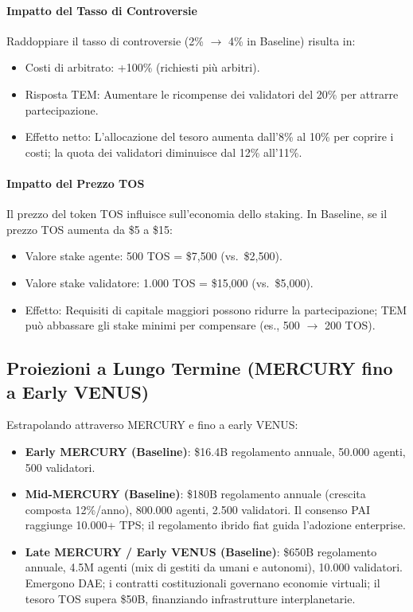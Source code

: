 \documentclass[11pt]{article}
\begin{document}
\begin{itemize}[noitemsep]
\paragraph{Impatto del Tasso di Controversie}
Raddoppiare il tasso di controversie (2\% $\to$ 4\% in Baseline) risulta in:
\begin{itemize}[noitemsep]
  \item Costi di arbitrato: +100\% (richiesti più arbitri).
  \item Risposta TEM: Aumentare le ricompense dei validatori del 20\% per attrarre partecipazione.
  \item Effetto netto: L'allocazione del tesoro aumenta dall'8\% al 10\% per coprire i costi; la quota dei validatori diminuisce dal 12\% all'11\%.
\end{itemize}

\paragraph{Impatto del Prezzo TOS}
Il prezzo del token TOS influisce sull'economia dello staking. In Baseline, se il prezzo TOS aumenta da \$5 a \$15:
\begin{itemize}[noitemsep]
  \item Valore stake agente: 500 TOS = \$7{,}500 (vs.\ \$2{,}500).
  \item Valore stake validatore: 1.000 TOS = \$15{,}000 (vs.\ \$5{,}000).
  \item Effetto: Requisiti di capitale maggiori possono ridurre la partecipazione; TEM può abbassare gli stake minimi per compensare (es., 500 $\to$ 200 TOS).
\end{itemize}

\subsection{Proiezioni a Lungo Termine (MERCURY fino a Early VENUS)}
Estrapolando attraverso MERCURY e fino a early VENUS:
\begin{itemize}[noitemsep]
  \item \textbf{Early MERCURY (Baseline)}: \$16.4B regolamento annuale, 50.000 agenti, 500 validatori.
  \item \textbf{Mid-MERCURY (Baseline)}: \$180B regolamento annuale (crescita composta 12\%/anno), 800.000 agenti, 2.500 validatori. Il consenso PAI raggiunge 10.000+ TPS; il regolamento ibrido fiat guida l'adozione enterprise.
  \item \textbf{Late MERCURY / Early VENUS (Baseline)}: \$650B regolamento annuale, 4.5M agenti (mix di gestiti da umani e autonomi), 10.000 validatori. Emergono DAE; i contratti costituzionali governano economie virtuali; il tesoro TOS supera \$50B, finanziando infrastrutture interplanetarie.
\end{itemize}


\end{itemize}
\end{document}
